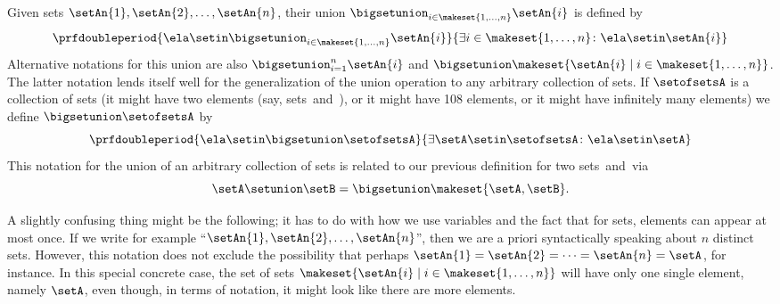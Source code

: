 Given sets $\setAn{1}, \setAn{2}, \dots, \setAn{n}$, their union $\bigsetunion_{i \in \makeset{1,\dots, n}} \setAn{i}$ is defined by
\begin{equation}
    \prfdoubleperiod{ \ela \setin \bigsetunion_{i \in \makeset{1,\dots, n}} \setAn{i} }{\exists i \in \makeset{1,\dots, n} \colon \ela \setin\setAn{i}}
\end{equation}
Alternative notations for this union are also $\bigsetunion_{i = 1}^{n} \setAn{i}$ and $\bigsetunion \makeset{ \setAn{i} \mid i \in \makeset{1,\dots, n}}$.
The latter notation lends itself well for the generalization of the union operation to any arbitrary collection of sets.
If $\setofsetsA$ is a collection of sets (it might have two elements (say, sets~\setA and~\setB), or it might have 108 elements, or it might have infinitely many elements) we define $\bigsetunion \setofsetsA$ by
%
\begin{equation}
    \prfdoubleperiod{ \ela \setin\bigsetunion \setofsetsA }{\exists \setA \setin\setofsetsA \colon \ela \setin\setA}
\end{equation}
%
This notation for the union of an arbitrary collection of sets is related to our previous definition for two sets~\setA and~\setB via
\begin{equation}
    \setA \setunion \setB = \bigsetunion \makeset{ \setA, \setB }.
\end{equation}

\begin{remark}
    A slightly confusing thing might be the following; it has to do with how we use variables and the fact that for sets, elements can appear at most once.
    If we write for example ``$\setAn{1}, \setAn{2}, \dots, \setAn{n}$'', then we are a priori syntactically speaking about $n$ distinct sets.
    However, this notation does not exclude the possibility that perhaps $\setAn{1} = \setAn{2} = \dots = \setAn{n} = \setA$, for instance.
    In this special concrete case, the set of sets $\makeset{ \setAn{i} \mid i \in \makeset{1,\dots, n}}$ will have only one single element, namely $\setA$, even though, in terms of notation, it might look like there are more elements.
\end{remark}

